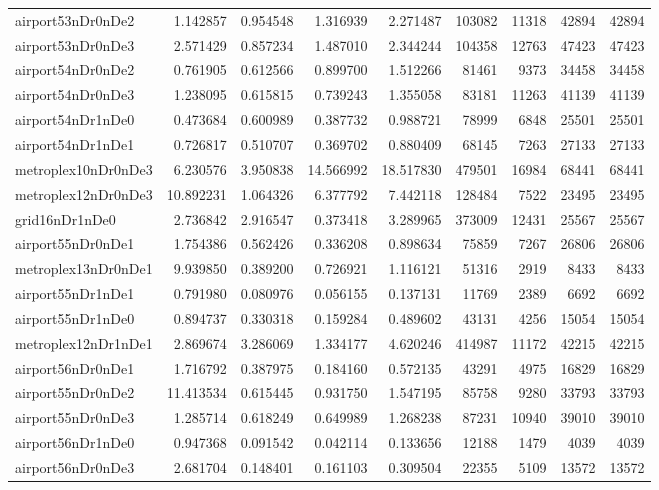 \begin{longtable}{|l|r|r|r|r|r|r|r|r|}
airport53nDr0nDe2 & 1.142857 & 0.954548 & 1.316939 & 2.271487 & 103082 & 11318 & 42894 & 42894 \\
airport53nDr0nDe3 & 2.571429 & 0.857234 & 1.487010 & 2.344244 & 104358 & 12763 & 47423 & 47423 \\
airport54nDr0nDe2 & 0.761905 & 0.612566 & 0.899700 & 1.512266 & 81461 & 9373 & 34458 & 34458 \\
airport54nDr0nDe3 & 1.238095 & 0.615815 & 0.739243 & 1.355058 & 83181 & 11263 & 41139 & 41139 \\
airport54nDr1nDe0 & 0.473684 & 0.600989 & 0.387732 & 0.988721 & 78999 & 6848 & 25501 & 25501 \\
airport54nDr1nDe1 & 0.726817 & 0.510707 & 0.369702 & 0.880409 & 68145 & 7263 & 27133 & 27133 \\
metroplex10nDr0nDe3 & 6.230576 & 3.950838 & 14.566992 & 18.517830 & 479501 & 16984 & 68441 & 68441 \\
metroplex12nDr0nDe3 & 10.892231 & 1.064326 & 6.377792 & 7.442118 & 128484 & 7522 & 23495 & 23495 \\
grid16nDr1nDe0 & 2.736842 & 2.916547 & 0.373418 & 3.289965 & 373009 & 12431 & 25567 & 25567 \\
airport55nDr0nDe1 & 1.754386 & 0.562426 & 0.336208 & 0.898634 & 75859 & 7267 & 26806 & 26806 \\
metroplex13nDr0nDe1 & 9.939850 & 0.389200 & 0.726921 & 1.116121 & 51316 & 2919 & 8433 & 8433 \\
airport55nDr1nDe1 & 0.791980 & 0.080976 & 0.056155 & 0.137131 & 11769 & 2389 & 6692 & 6692 \\
airport55nDr1nDe0 & 0.894737 & 0.330318 & 0.159284 & 0.489602 & 43131 & 4256 & 15054 & 15054 \\
metroplex12nDr1nDe1 & 2.869674 & 3.286069 & 1.334177 & 4.620246 & 414987 & 11172 & 42215 & 42215 \\
airport56nDr0nDe1 & 1.716792 & 0.387975 & 0.184160 & 0.572135 & 43291 & 4975 & 16829 & 16829 \\
airport55nDr0nDe2 & 11.413534 & 0.615445 & 0.931750 & 1.547195 & 85758 & 9280 & 33793 & 33793 \\
airport55nDr0nDe3 & 1.285714 & 0.618249 & 0.649989 & 1.268238 & 87231 & 10940 & 39010 & 39010 \\
airport56nDr1nDe0 & 0.947368 & 0.091542 & 0.042114 & 0.133656 & 12188 & 1479 & 4039 & 4039 \\
airport56nDr0nDe3 & 2.681704 & 0.148401 & 0.161103 & 0.309504 & 22355 & 5109 & 13572 & 13572 \\

\end{longtable}
